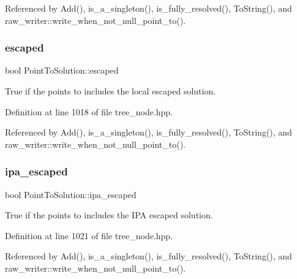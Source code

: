 Referenced by Add(), is\+\_\+a\+\_\+singleton(), is\+\_\+fully\+\_\+resolved(), To\+String(), and raw\+\_\+writer\+::write\+\_\+when\+\_\+not\+\_\+null\+\_\+point\+\_\+to().

\mbox{\label{structPointToSolution_a95a7e7a47d0add8f5adb4d66e23d9d31}} 
\subsubsection{\texorpdfstring{escaped}{escaped}}
{\footnotesize\ttfamily bool Point\+To\+Solution\+::escaped}



True if the points to includes the local escaped solution. 



Definition at line 1018 of file tree\+\_\+node.\+hpp.



Referenced by Add(), is\+\_\+a\+\_\+singleton(), is\+\_\+fully\+\_\+resolved(), To\+String(), and raw\+\_\+writer\+::write\+\_\+when\+\_\+not\+\_\+null\+\_\+point\+\_\+to().

\mbox{\label{structPointToSolution_a084aba38b17b29c3459a60a3e4c49036}} 
\subsubsection{\texorpdfstring{ipa\+\_\+escaped}{ipa\_escaped}}
{\footnotesize\ttfamily bool Point\+To\+Solution\+::ipa\+\_\+escaped}



True if the points to includes the I\+PA escaped solution. 



Definition at line 1021 of file tree\+\_\+node.\+hpp.



Referenced by Add(), is\+\_\+a\+\_\+singleton(), is\+\_\+fully\+\_\+resolved(), To\+String(), and raw\+\_\+writer\+::write\+\_\+when\+\_\+not\+\_\+null\+\_\+point\+\_\+to().

\mbox{\label{structPointToSolution_a7225c28817c1a33923b92b4de4e814ed}} 
